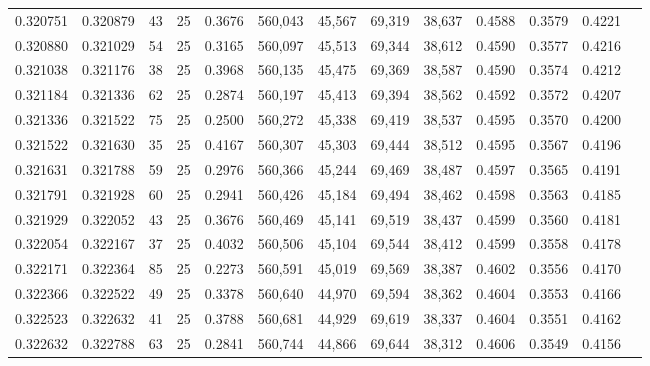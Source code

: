 \begin{tabular}{rrrrrrrrrrrrr}
0.320751 & 0.320879 &    43 &  25 &                                     0.3676 & 560,043 &  45,567 &  69,319 &  38,637 & 0.4588 & 0.3579 & 0.4221 \\
0.320880 & 0.321029 &    54 &  25 &                                     0.3165 & 560,097 &  45,513 &  69,344 &  38,612 & 0.4590 & 0.3577 & 0.4216 \\
0.321038 & 0.321176 &    38 &  25 &                                     0.3968 & 560,135 &  45,475 &  69,369 &  38,587 & 0.4590 & 0.3574 & 0.4212 \\
0.321184 & 0.321336 &    62 &  25 &                                     0.2874 & 560,197 &  45,413 &  69,394 &  38,562 & 0.4592 & 0.3572 & 0.4207 \\
0.321336 & 0.321522 &    75 &  25 &                                     0.2500 & 560,272 &  45,338 &  69,419 &  38,537 & 0.4595 & 0.3570 & 0.4200 \\
0.321522 & 0.321630 &    35 &  25 &                                     0.4167 & 560,307 &  45,303 &  69,444 &  38,512 & 0.4595 & 0.3567 & 0.4196 \\
0.321631 & 0.321788 &    59 &  25 &                                     0.2976 & 560,366 &  45,244 &  69,469 &  38,487 & 0.4597 & 0.3565 & 0.4191 \\
0.321791 & 0.321928 &    60 &  25 &                                     0.2941 & 560,426 &  45,184 &  69,494 &  38,462 & 0.4598 & 0.3563 & 0.4185 \\
0.321929 & 0.322052 &    43 &  25 &                                     0.3676 & 560,469 &  45,141 &  69,519 &  38,437 & 0.4599 & 0.3560 & 0.4181 \\
0.322054 & 0.322167 &    37 &  25 &                                     0.4032 & 560,506 &  45,104 &  69,544 &  38,412 & 0.4599 & 0.3558 & 0.4178 \\
0.322171 & 0.322364 &    85 &  25 &                                     0.2273 & 560,591 &  45,019 &  69,569 &  38,387 & 0.4602 & 0.3556 & 0.4170 \\
0.322366 & 0.322522 &    49 &  25 &                                     0.3378 & 560,640 &  44,970 &  69,594 &  38,362 & 0.4604 & 0.3553 & 0.4166 \\
0.322523 & 0.322632 &    41 &  25 &                                     0.3788 & 560,681 &  44,929 &  69,619 &  38,337 & 0.4604 & 0.3551 & 0.4162 \\
0.322632 & 0.322788 &    63 &  25 &                                     0.2841 & 560,744 &  44,866 &  69,644 &  38,312 & 0.4606 & 0.3549 & 0.4156 \\

\end{tabular}
